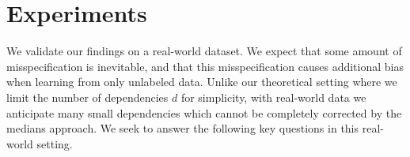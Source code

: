 \section{Experiments} \label{sec:exp}






We validate our findings on a real-world dataset. We expect that some amount of misspecification is inevitable, and that this misspecification causes additional bias when learning from only unlabeled data. Unlike our theoretical setting where we limit the number of dependencies $d$ for simplicity, with real-world data we anticipate many small dependencies which cannot be completely corrected by the medians approach. We seek to answer the following key questions in this real-world setting.

